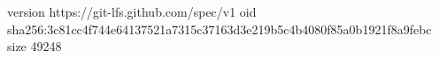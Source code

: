 version https://git-lfs.github.com/spec/v1
oid sha256:3c81cc4f744e64137521a7315c37163d3e219b5c4b4080f85a0b1921f8a9febc
size 49248
